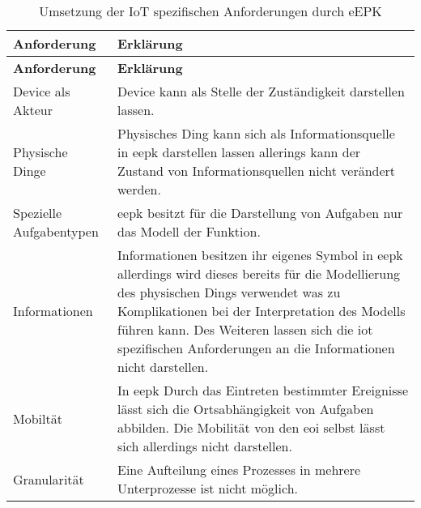  \begin{longtable}{P{4cm}|X}
  \caption{Umsetzung der IoT spezifischen Anforderungen durch eEPK}\\
  \label{table:evaluierungskriterien}
  \textbf{Anforderung} & \textbf{Erklärung}   \\ \hline
  \endfirsthead %
  \textbf{Anforderung} & \textbf{Erklärung}  \\ \hline
  \endhead %

  Device als Akteur & Device kann als Stelle der Zuständigkeit darstellen lassen. \\ \hline
  Physische Dinge  & Physisches Ding kann sich als Informationsquelle in \ac{eepk} darstellen lassen allerings kann der Zustand von Informationsquellen nicht verändert werden.\\ \hline
  Spezielle Aufgabentypen & \ac{eepk} besitzt für die Darstellung von Aufgaben nur das Modell der Funktion.\\ \hline
  Informationen  & Informationen besitzen ihr eigenes Symbol in \ac{eepk} allerdings wird dieses bereits für die Modellierung des physischen Dings verwendet was zu Komplikationen bei der Interpretation des Modells führen kann. Des Weiteren lassen sich die \ac{iot} spezifischen Anforderungen an die Informationen nicht darstellen.\\ \hline
  Mobiltät & In \ac{eepk} Durch das Eintreten bestimmter Ereignisse lässt sich die Ortsabhängigkeit von Aufgaben abbilden. Die Mobilität von den \ac{eoi} selbst lässt sich allerdings nicht darstellen.\\ \hline
  Granularität & Eine Aufteilung eines Prozesses in mehrere Unterprozesse ist nicht möglich.\\
 \end{longtable}
